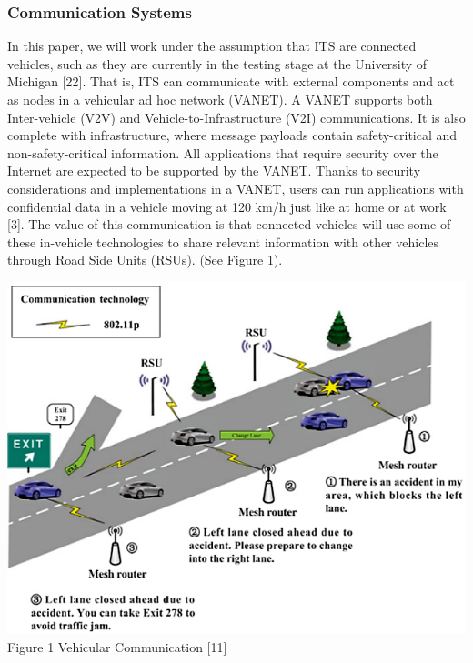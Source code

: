 \documentclass[conference,compsoc]{IEEEtran}
\begin{document}
\subsubsection{Communication Systems}
In this paper, we will work under the assumption that ITS are connected vehicles, such as they are currently in the testing stage at the University of Michigan [22]. That is, ITS can communicate with external components and act as nodes in a vehicular ad hoc network (VANET). A VANET supports both Inter-vehicle (V2V) and Vehicle-to-Infrastructure (V2I) communications. It is also complete with infrastructure, where message payloads contain safety-critical and non-safety-critical information. All applications that require security over the Internet are expected to be supported by the VANET. Thanks to security considerations and implementations in a VANET, users can run applications with confidential data in a vehicle moving at 120 km/h just like at home or at work [3]. The value of this communication is that connected vehicles will use some of these in-vehicle technologies to share relevant information with other vehicles through Road Side Units (RSUs). (See Figure 1).
\begin{center}
\includegraphics[scale = .49]{vanet.png}\\
\small{Figure 1 Vehicular Communication [11]}
\break
\end{center}
\end{document}
